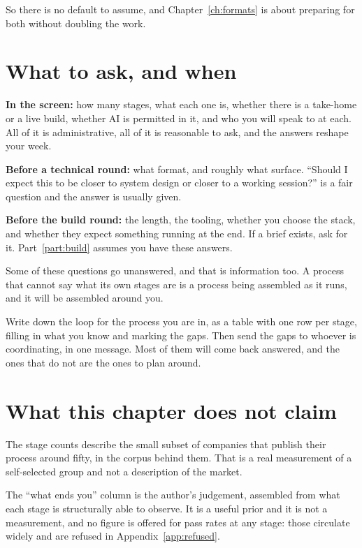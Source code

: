 So there is no default to assume, and Chapter~\ref{ch:formats} is about
preparing for both without doubling the work.

\section{What to ask, and when}

\begin{kitmethod}
\textbf{In the screen:} how many stages, what each one is, whether there is a
take-home or a live build, whether AI is permitted in it, and who you will
speak to at each. All of it is administrative, all of it is reasonable to ask,
and the answers reshape your week.

\textbf{Before a technical round:} what format, and roughly what surface.
``Should I expect this to be closer to system design or closer to a working
session?'' is a fair question and the answer is usually given.

\textbf{Before the build round:} the length, the tooling, whether you choose
the stack, and whether they expect something running at the end. If a brief
exists, ask for it. Part~\ref{part:build} assumes you have these answers.
\end{kitmethod}

\begin{kitnote}
Some of these questions go unanswered, and that is information too. A process
that cannot say what its own stages are is a process being assembled as it
runs, and it will be assembled around you.
\end{kitnote}

\begin{drill}
Write down the loop for the process you are in, as a table with one row per
stage, filling in what you know and marking the gaps. Then send the gaps to
whoever is coordinating, in one message. Most of them will come back answered,
and the ones that do not are the ones to plan around.
\end{drill}

\section*{What this chapter does not claim}

The stage counts describe the small subset of companies that publish their
process \dash{} around fifty, in the corpus behind them. That is a real
measurement of a self-selected group and not a description of the market.

The ``what ends you'' column is the author's judgement, assembled from what
each stage is structurally able to observe. It is a useful prior and it is not
a measurement, and no figure is offered for pass rates at any stage: those
circulate widely and are refused in Appendix~\ref{app:refused}.
